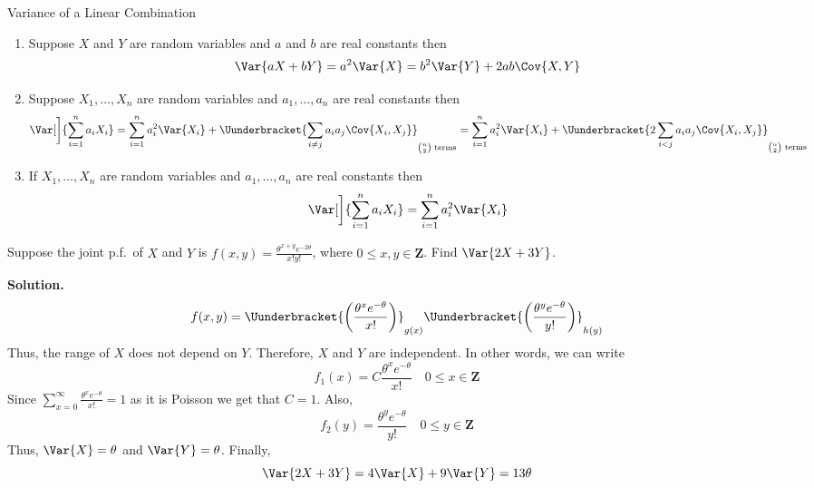\begin{Theorem}{Variance of a Linear Combination}{}
    \begin{enumerate}[label=(\arabic*)]
        \item Suppose $ X $ and $ Y $ are random variables
              and $ a $ and $ b $ are real constants then
              \[ \Var{aX+bY}=a^2\Var{X}=b^2\Var{Y}+2ab\Cov{X,Y} \]
        \item Suppose $ X_1,\ldots,X_n $ are random variables
              and $ a_1,\ldots,a_n $ are real constants then
              \[ \Var[\bigg]{\sum_{i=1}^{n} a_i X_i}=
                  \sum_{i=1}^{n} a_i^2 \Var{X_i}+\Uunderbracket{\sum_{i\neq j}a_i a_j\Cov{X_i,X_j}}_{\binom{n}{2}\text{ terms}}=
                  \sum_{i=1}^{n} a_i^2\Var{X_i}
                  +\Uunderbracket{2\sum_{i<j}a_i a_j\Cov{X_i,X_j}}_{\binom{n}{2}\text{ terms}} \]
        \item If $ X_1,\ldots,X_n $ are random variables
              and $ a_1,\ldots,a_n $ are real constants then
              \[ \Var[\bigg]{\sum_{i=1}^{n} a_i X_i}=\sum_{i=1}^{n} a_i^2\Var{X_i} \]
    \end{enumerate}
\end{Theorem}
\begin{Example}{}{}
    Suppose the joint p.f.\ of $ X $ and $ Y $ is
    $ \displaystyle f(x,y)=\frac{\theta^{x+y}e^{-2\theta}}{x!y!} $,
    where $ 0\le x,y\in\mathbf{Z} $.
    Find $ \Var{2X+3Y} $.

    \textbf{Solution.}
    \[ f(x,y)=\Uunderbracket{\biggl( \frac{\theta^x e^{-\theta}}{x!} \biggr)}_{g(x)}
        \Uunderbracket{\biggl( \frac{\theta^y e^{-\theta}}{y!} \biggr)}_{h(y)} \]
    Thus, the range of $ X $ does not depend on $ Y $. Therefore,
    $ X $ and $ Y $ are independent. In other words, we can write
    \[ f_1(x)=C \frac{\theta^x e^{-\theta}}{x!} \quad 0\le x\in\mathbf{Z} \]
    Since $ \displaystyle \sum_{x=0}^{\infty} \frac{\theta^x e^{-\theta}}{x!} =1 $
    as it is Poisson we get that $ C=1 $. Also,
    \[ f_2(y)=\frac{\theta^y e^{-\theta}}{y!}\quad 0\le y\in\mathbf{Z} \]
    Thus, $ \Var{X}=\theta $ and $ \Var{Y}=\theta $. Finally,
    \[ \Var{2X+3Y}=4\Var{X}+9\Var{Y}=13\theta \]
\end{Example}
